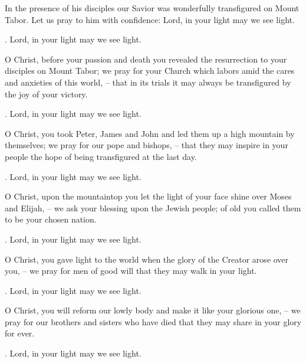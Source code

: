 \lettrine[loversize=0.15,lines=2]{I}{}n the presence of his disciples our Savior was wonderfully transfigured on Mount Tabor.  Let us pray to him with confidence: Lord, in your light may we see light.
\par \Rbar. Lord, in your light may we see light.

O Christ, before your passion and death you revealed the resurrection to your disciples on Mount Tabor; we pray for your Church which labors amid the cares and anxieties of this world,
– that in its trials it may always be transfigured by the joy of your victory.
\par \Rbar. Lord, in your light may we see light.

O Christ, you took Peter, James and John and led them up a high mountain by themselves; we pray for our pope and bishops,
– that they may inspire in your people the hope of being transfigured at the last day.
\par \Rbar. Lord, in your light may we see light.

O Christ, upon the mountaintop you let the light of your face shine over Moses and Elijah,
– we ask your blessing upon the Jewish people; of old you called them to be your chosen nation.
\par \Rbar. Lord, in your light may we see light.

O Christ, you gave light to the world when the glory of the Creator arose over you,
– we pray for men of good will that they may walk in your light.
\par \Rbar. Lord, in your light may we see light.

O Christ, you will reform our lowly body and make it like your glorious one,
– we pray for our brothers and sisters who have died that they may share in your glory for ever.
\par \Rbar. Lord, in your light may we see light.
